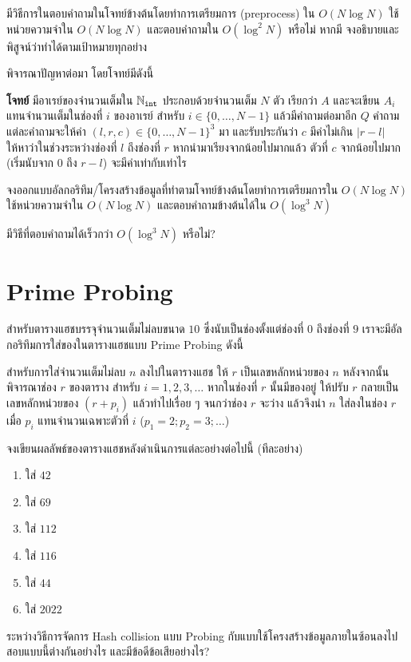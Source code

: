 \begin{exercise}
มีวิธีการในตอบคำถามในโจทย์ข้างต้นโดยทำการเตรียมการ (preprocess) ใน $O(N \log N)$ ใช้หน่วยความจำใน $O(N \log N)$ และตอบคำถามใน $O(\log^2 N)$ หรือไม่ หากมี จงอธิบายและพิสูจน์ว่าทำได้ตามเป้าหมายทุกอย่าง
\end{exercise}

พิจารณาปัญหาต่อมา โดยโจทย์มีดังนี้

\textbf{โจทย์} มีอาเรย์ของจำนวนเต็มใน $\mathbb{N}_{\texttt{int}}$ ประกอบด้วยจำนวนเต็ม $N$ ตัว เรียกว่า $A$ และจะเขียน $A_i$ แทนจำนวนเต็มในช่องที่ $i$ ของอาเรย์ สำหรับ $i \in \{0, \dots, N-1\}$ แล้วมีคำถามต่อมาอีก $Q$ คำถาม แต่ละคำถามจะให้ค่า $(l, r, c) \in \{0, \dots, N-1\}^3$ มา และรับประกันว่า $c$ มีค่าไม่เกิน $|r-l|$ ให้หาว่าในช่วงระหว่างช่องที่ $l$ ถึงช่องที่ $r$ หากนำมาเรียงจากน้อยไปมากแล้ว ตัวที่ $c$ จากน้อยไปมาก (เริ่มนับจาก $0$ ถึง $r-l$) จะมีค่าเท่ากับเท่าไร

\begin{exercise}
จงออกแบบอัลกอริทึม/โครงสร้างข้อมูลที่ทำตามโจทย์ข้างต้นโดยทำการเตรียมการใน $O(N \log N)$ ใช้หน่วยความจำใน $O(N \log N)$ และตอบคำถามข้างต้นได้ใน $O(\log^3 N)$
\end{exercise}

\begin{bonus}
มีวิธีที่ตอบคำถามได้เร็วกว่า $O(\log^3 N)$ หรือไม่?
\end{bonus}

\section{Prime Probing}

\begin{exercise}
สำหรับตารางแฮชบรรจุจำนวนเต็มไม่ลบขนาด $10$ ซึ่งนับเป็นช่องตั้งแต่ช่องที่ $0$ ถึงช่องที่ $9$ เราจะมีอัลกอริทึมการใส่ของในตารางแฮชแบบ Prime Probing ดังนี้

สำหรับการใส่จำนวนเต็มไม่ลบ $n$ ลงไปในตารางแฮช ให้ $r$ เป็นเลขหลักหน่วยของ $n$ หลังจากนั้นพิจารณาช่อง $r$ ของตาราง สำหรับ $i = 1, 2, 3, \dots$ หากในช่องที่ $r$ นั้นมีของอยู่ ให้ปรับ $r$ กลายเป็นเลขหลักหน่วยของ $(r+p_i)$ แล้วทำไปเรื่อย ๆ จนกว่าช่อง $r$ จะว่าง แล้วจึงนำ $n$ ใส่ลงในช่อง $r$ เมื่อ $p_i$ แทนจำนวนเฉพาะตัวที่ $i$ ($p_1 = 2; p_2 = 3; \dots$)

จงเขียนผลลัพธ์ของตารางแฮชหลังดำเนินการแต่ละอย่างต่อไปนี้ (ทีละอย่าง)

\begin{enumerate}[nosep,label={\bfseries (\roman*)}]
    \item ใส่ $42$
    \item ใส่ $69$
    \item ใส่ $112$
    \item ใส่ $116$
    \item ใส่ $44$
    \item ใส่ $2022$
\end{enumerate}
\end{exercise}

\begin{exercise}
ระหว่างวิธีการจัดการ Hash collision แบบ Probing กับแบบใช้โครงสร้างข้อมูลภายในซ้อนลงไป สอบแบบนี้ต่างกันอย่างไร และมีข้อดีข้อเสียอย่างไร?
\end{exercise}